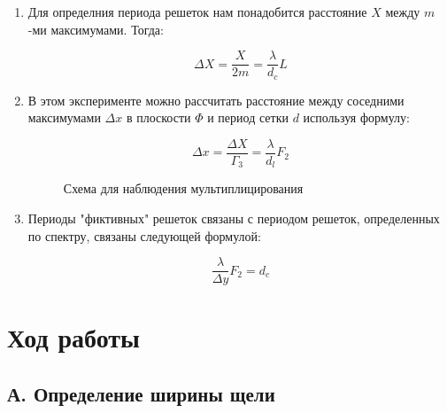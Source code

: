 \documentclass[12pt]{article}
\begin{document}
\begin{enumerate}
\item Для определния периода решеток нам понадобится расстояние $X$ между $m$-ми максимумами. Тогда:

\begin{equation}
\label{3}
    \Delta X = \frac{X}{2m} = \frac{\lambda}{d_c}L
\end{equation}  

\item В этом эксперименте можно рассчитать расстояние между соседними максимумами $\Delta x$ в плоскости $\Phi$ и период сетки $d$ используя формулу:

\begin{equation}
\label{4}
    \Delta x = \frac{\Delta X}{\Gamma_3} = \frac{\lambda}{d_l}F_2
\end{equation}  


\begin{figure}[h!]
    \noindent{}
    \caption{Схема для наблюдения мультиплицирования}
\end{figure}

\item Периоды "фиктивных" решеток связаны с периодом решеток, определенных по спектру, связаны следующей формулой:


\begin{equation}
\label{5}
    \frac{\lambda}{\Delta y} F_2 = d_c 
\end{equation} 

\end{enumerate}

\newpage

\section*{Ход работы}

\subsection*{А. Определение  ширины щели}
\end{document}
